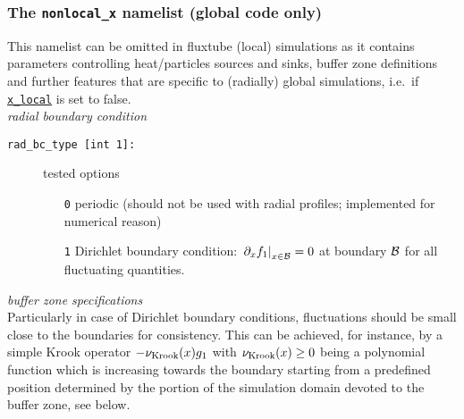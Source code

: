 \documentclass[12pt]{article}
\begin{document}
\subsubsection{The \texttt{nonlocal\_x} namelist (global code only)}
\hypertarget{nonlocal_x_nml}{}
This namelist can be omitted in fluxtube (local) simulations as it contains parameters controlling heat/particles
sources and sinks, buffer zone definitions and further features that are specific to (radially) global simulations,
i.e.~if \hyperlink{x_local}{\texttt{x\_local}} is set to false.\\[1ex]
%
{\em radial boundary condition}
\begin{description}
 \item [\texttt{rad\_bc\_type [int 1]:}] tested options
 \begin{itemize}
 \item[{\tt 0}] periodic (should not be used with radial profiles; implemented for numerical reason)
 \item[{\tt 1}] Dirichlet boundary condition: $\left.\partial_x f_1\right|_{x\in {\cal B}} = 0$ at boundary ${\cal B}$
 for all fluctuating quantities.
 \end{itemize}


\end{description}
%
{\em buffer zone specifications}\\[1ex]
Particularly in case of Dirichlet boundary conditions, fluctuations should be small close to the boundaries for consistency.
This can be achieved, for instance, by a simple Krook operator $-\nu_{\rm Krook}(x) g_1$ with $\nu_{\rm Krook}(x)\geq 0$ being a polynomial function
which is increasing towards the boundary starting from a predefined position determined by the portion of the simulation domain devoted to the
buffer zone, see below.
\end{document}

